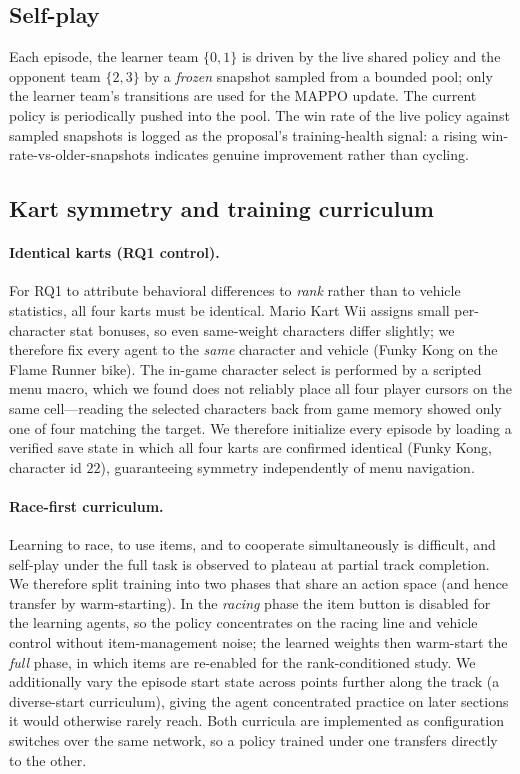\documentclass{article}
\begin{document}
\subsection{Self-play}

Each episode, the learner team $\{0,1\}$ is driven by the live shared policy and
the opponent team $\{2,3\}$ by a \emph{frozen} snapshot sampled from a bounded
pool; only the learner team's transitions are used for the MAPPO update. The
current policy is periodically pushed into the pool. The win rate of the live
policy against sampled snapshots is logged as the proposal's training-health
signal: a rising win-rate-vs-older-snapshots indicates genuine improvement rather
than cycling.

\subsection{Kart symmetry and training curriculum}
\label{sec:controls}

\paragraph{Identical karts (RQ1 control).} For RQ1 to attribute behavioral
differences to \emph{rank} rather than to vehicle statistics, all four karts must
be identical. Mario Kart Wii assigns small per-character stat bonuses, so even
same-weight characters differ slightly; we therefore fix every agent to the
\emph{same} character and vehicle (Funky Kong on the Flame Runner bike). The
in-game character select is performed by a scripted menu macro, which we found
does not reliably place all four player cursors on the same cell---reading the
selected characters back from game memory showed only one of four matching the
target. We therefore initialize every episode by loading a verified save state in
which all four karts are confirmed identical (Funky Kong, character id $22$),
guaranteeing symmetry independently of menu navigation.

\paragraph{Race-first curriculum.} Learning to race, to use items, and to
cooperate simultaneously is difficult, and self-play under the full task is
observed to plateau at partial track completion. We therefore split training into
two phases that share an action space (and hence transfer by warm-starting). In
the \emph{racing} phase the item button is disabled for the learning agents, so
the policy concentrates on the racing line and vehicle control without
item-management noise; the learned weights then warm-start the \emph{full} phase,
in which items are re-enabled for the rank-conditioned study. We additionally vary
the episode start state across points further along the track (a diverse-start
curriculum), giving the agent concentrated practice on later sections it would
otherwise rarely reach. Both curricula are implemented as configuration switches
over the same network, so a policy trained under one transfers directly to the
other.
\end{document}
